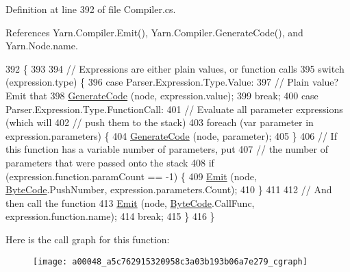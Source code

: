 Definition at line 392 of file Compiler.\-cs.



References Yarn.\-Compiler.\-Emit(), Yarn.\-Compiler.\-Generate\-Code(), and Yarn.\-Node.\-name.


\begin{DoxyCode}
392                                                                    \{
393 
394             \textcolor{comment}{// Expressions are either plain values, or function calls}
395             \textcolor{keywordflow}{switch} (expression.type) \{
396             \textcolor{keywordflow}{case} Parser.Expression.Type.Value:
397                 \textcolor{comment}{// Plain value? Emit that}
398                 \hyperlink{a00048_a006f3becd521cc179ba3d3352f6f930b}{GenerateCode} (node, expression.value);
399                 \textcolor{keywordflow}{break};
400             \textcolor{keywordflow}{case} Parser.Expression.Type.FunctionCall:
401                 \textcolor{comment}{// Evaluate all parameter expressions (which will}
402                 \textcolor{comment}{// push them to the stack)}
403                 \textcolor{keywordflow}{foreach} (var parameter \textcolor{keywordflow}{in} expression.parameters) \{
404                     \hyperlink{a00048_a006f3becd521cc179ba3d3352f6f930b}{GenerateCode} (node, parameter);
405                 \}
406                 \textcolor{comment}{// If this function has a variable number of parameters, put}
407                 \textcolor{comment}{// the number of parameters that were passed onto the stack}
408                 \textcolor{keywordflow}{if} (expression.function.paramCount == -1) \{
409                     \hyperlink{a00048_a774e8c143cdda0584fcfdda98626a83c}{Emit} (node, \hyperlink{a00045_ad5dfb6ee68ca7469623ad3e459f98894}{ByteCode}.PushNumber, expression.parameters.Count);
410                 \}
411 
412                 \textcolor{comment}{// And then call the function}
413                 \hyperlink{a00048_a774e8c143cdda0584fcfdda98626a83c}{Emit} (node, \hyperlink{a00045_ad5dfb6ee68ca7469623ad3e459f98894}{ByteCode}.CallFunc, expression.function.name);
414                 \textcolor{keywordflow}{break};
415             \}
416         \}
\end{DoxyCode}


Here is the call graph for this function\-:
\nopagebreak
\begin{figure}[H]
\begin{center}
\leavevmode
\texttt{[image: a00048\_a5c762915320958c3a03b193b06a7e279\_cgraph]}
\end{center}
\end{figure}


